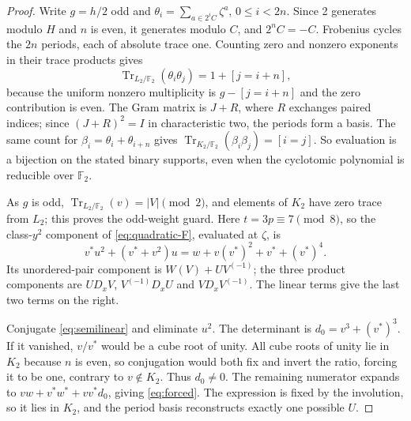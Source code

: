 \documentclass[11pt]{article}
\theoremstyle{definition}
\theoremstyle{remark}
\begin{document}
\begin{proof}
Write $g=h/2$ odd and
$\theta_i=\sum_{a\in2^iC}\zeta^a$, $0\le i<2n$.
Since 2 generates modulo $H$ and $n$ is even, it generates modulo $C$,
and $2^nC=-C$. Frobenius cycles the $2n$ periods, each of absolute trace
one. Counting zero and nonzero exponents in their trace products gives
\[
 \operatorname{Tr}_{L_2/\mathbb F_2}(\theta_i\theta_j)
       =1+[j=i+n],
\]
because the uniform nonzero multiplicity is $g-[j=i+n]$ and the zero
contribution is even. The Gram matrix is $J+R$, where $R$ exchanges paired
indices; since $(J+R)^2=I$ in characteristic two, the periods form a
basis. The same count for $\beta_i=\theta_i+\theta_{i+n}$ gives
$\operatorname{Tr}_{K_2/\mathbb F_2}(\beta_i\beta_j)=[i=j]$.
So evaluation is a bijection on the stated binary supports, even when
the cyclotomic polynomial is reducible over $\mathbb F_2$.

As $g$ is odd, $\operatorname{Tr}_{L_2/\mathbb F_2}(v)=|V|\pmod2$, and
elements of $K_2$ have zero trace from $L_2$; this proves the odd-weight
guard. Here $t=3p\equiv7\pmod8$, so the class-$y^2$ component of
\eqref{eq:quadratic-F}, evaluated at $\zeta$, is
\begin{equation}\label{eq:semilinear}
 v^*u^2+(v^*+v^2)u=w+v(v^*)^2+v^*+(v^*)^4.
\end{equation}
Its unordered-pair component is $W(V)+UV^{(-1)}$;
the three product components are $U D_xV$, $V^{(-1)}D_xU$ and
$VD_xV^{(-1)}$. The linear terms give the last two terms on the right.

Conjugate \eqref{eq:semilinear} and eliminate $u^2$. The determinant is
$d_0=v^3+(v^*)^3$. If it vanished, $v/v^*$ would be a cube root of unity.
All cube roots of unity lie in $K_2$ because $n$ is even, so conjugation would both fix and
invert the ratio, forcing it to be one, contrary to $v\notin K_2$. Thus
$d_0\ne0$. The remaining numerator expands to $vw+v^*w^*+vv^*d_0$, giving
\eqref{eq:forced}. The expression is fixed by the involution, so it lies
in $K_2$, and the period basis reconstructs exactly one possible $U$.
\end{proof}
\end{document}
